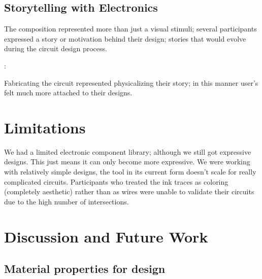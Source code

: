 \documentclass{sigchi}
\begin{document}
\subsection{Storytelling with Electronics}
  The composition represented more than just a visual stimuli; several participants expressed a story or motivation behind their design; stories that would evolve during the circuit design process.
  \begin{myquote}
   \vspace{-2pt}
    :
    \vspace{-2pt}
  \end{myquote}
  Fabricating the circuit represented physicalizing their story; in this manner user's felt much more attached to their designs.

\section{Limitations}
  We had a limited electronic component library; although we still got expressive designs. This just means it can only become more expressive. We were working with relatively simple designs, the tool in its current form doesn't scale for really complicated circuits. Participants who treated the ink traces as coloring (completely aesthetic) rather than as wires were unable to validate their circuits due to the high number of intersections.


\section {Discussion and Future Work}

\subsection{Material properties for design}
\end{document}
